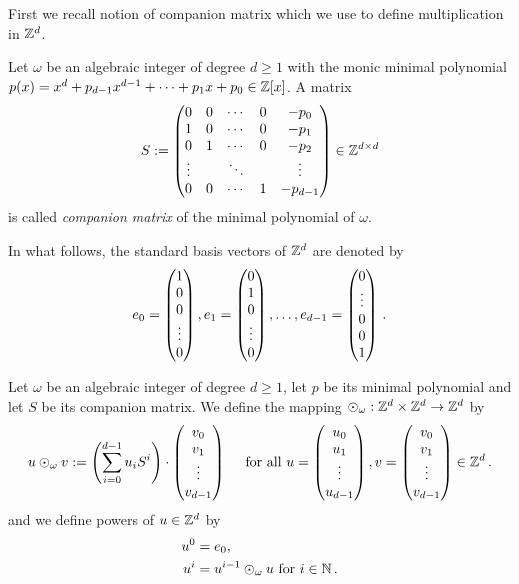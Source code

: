 First we recall notion of companion matrix which we use to define multiplication in $\mathbb{Z}^d$.
\begin{defn}
Let $\omega$ be an algebraic integer of degree $d\geq 1$ with the monic minimal polynomial $p(x)=x^d +p_{d-1}x^{d-1}+ \cdots + p_1 x+p_0 \in \mathbb{Z}[x]$. A matrix 
$$
S := \begin{pmatrix}
            0 & 0 & \cdots & 0 & -p_0 \\
            1 & 0 & \cdots & 0 & -p_1 \\
            0 & 1 & \cdots & 0 & -p_2 \\
            \vdots &   & \ddots & & \vdots \\
            0 & 0 & \cdots & 1 & -p_{d-1} 
            \end{pmatrix} \in \mathbb{Z}^{d\times d}
$$
is called \emph{companion matrix} of the minimal polynomial of $\omega$.
\end{defn}
In what follows, the standard basis vectors of $\mathbb{Z}^d$  are denoted by 
$$
e_0=\begin{pmatrix}
              1 \\
              0 \\
              0 \\
              \vdots \\
              0
              \end{pmatrix}, \\
e_1=\begin{pmatrix}
              0 \\
              1 \\
              0 \\
              \vdots \\
              0
              \end{pmatrix}, \dots ,\\
e_{d-1}=\begin{pmatrix}
              0 \\        
              \vdots \\
              0 \\
              0\\
              1
              \end{pmatrix}\,.             
$$

\begin{defn}
Let $\omega$ be an algebraic integer of degree $d\geq 1$, let $p$ be its minimal polynomial and let $S$ be its companion matrix. We define the mapping $\odot_\omega: \mathbb{Z}^d \times \mathbb{Z}^d \rightarrow \mathbb{Z}^d$ by 
$$
u \odot_\omega v := \left(\sum_{i=0}^{d-1} {u}_i S^i\right)\cdot \begin{pmatrix} {v}_0 \\ {v}_1 \\ \vdots \\ {v}_{d-1} \end{pmatrix} \quad \text{ for all } u=\begin{pmatrix} {u}_0 \\ {u}_1 \\ \vdots \\ {u}_{d-1} \end{pmatrix}, v=\begin{pmatrix} {v}_0 \\ {v}_1 \\ \vdots \\ {v}_{d-1} \end{pmatrix} \in \mathbb{Z}^d\,.
$$ 
and we define powers of $u \in \mathbb{Z}^d$ by
\begin{align*}
    u^0&=e_0, \\
    u^{i}&= u^{i-1} \odot_\omega u \text{ for } i\in\mathbb{N}\,.
\end{align*}
\end{defn}

